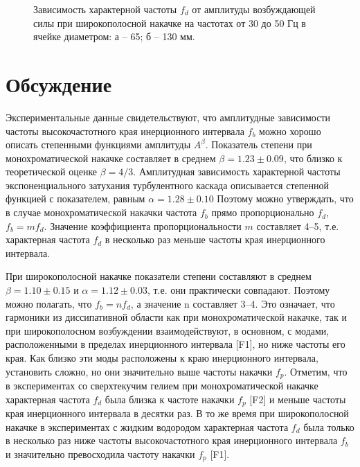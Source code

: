 \begin{figure}[ht]
  \begin{minipage}[ht]{0.49\linewidth}
  \end{minipage}
  \hfill
  \begin{minipage}[ht]{0.49\linewidth}
  \end{minipage}
  \caption{Зависимость характерной частоты $f_d$ от амплитуды возбуждающей силы при широкополосной накачке на частотах от 30 до 50 Гц в ячейке диаметром: а – 65; б – 130 мм.}
  \label{img:water_fd_wide}  
\end{figure}


\section{Обсуждение}%

Экспериментальные данные свидетельствуют, что амплитудные зависимости частоты высокочастотного края инерционного интервала $f_b$ можно хорошо описать степенными функциями амплитуды $A^\beta$. Показатель степени при монохроматической накачке составляет в среднем $\beta = 1.23 \pm 0.09$, что близко к теоретической оценке $\beta = 4/3$. Амплитудная зависимость характерной частоты экспоненциального затухания турбулентного каскада описывается степенной функцией с показателем, равным $\alpha = 1.28 \pm 0.10$ Поэтому можно утверждать, что в случае монохроматической накачки частота $f_b$ прямо пропорционально $f_d$, $f_b = m f_d$. Значение коэффициента пропорциональности $m$ составляет 4–5, т.е. характерная частота $f_d$ в несколько раз меньше частоты края инерционного интервала.

При широкополосной накачке показатели степени составляют в среднем $\beta = 1.10 \pm 0.15$ и $\alpha = 1.12 \pm 0.03$, т.е. они практически совпадают. Поэтому можно полагать, что $f_b = n f_d$, а значение n составляет 3–4. Это означает, что гармоники из диссипативной области как при монохроматической накачке, так и при широкополосном возбуждении взаимодействуют, в основном, с модами, расположенными в пределах инерционного интервала [F1], но ниже частоты его края. Как близко эти моды расположены к краю инерционного интервала, установить сложно, но они значительно выше частоты накачки $f_p$.
Отметим, что в экспериментах со сверхтекучим гелием при монохроматической накачке характерная частота $f_d$ была близка к частоте накачки $f_p$ [F2] и меньше частоты края инерционного интервала в десятки раз. В то же время при широкополосной накачке в экспериментах с жидким водородом характерная частота $f_d$ была только в несколько раз ниже частоты высокочастотного края инерционного интервала $f_b$ и значительно превосходила частоту накачки $f_p$ [F1].

